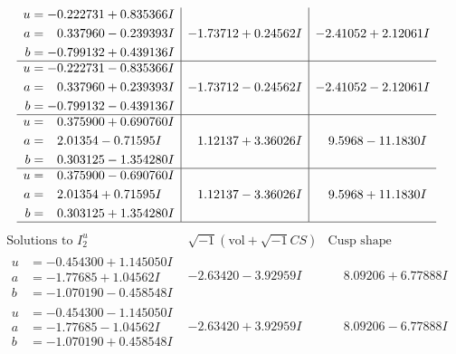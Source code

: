 \documentclass[1p]{elsarticle_modified}
\theoremstyle{definition}
\newcommand{\I}{\sqrt{-1}}
\begin{document}
$$\begin{array}{c|c|c}
\begin{aligned}
u &= -0.222731 + 0.835366 I \\
a &= \phantom{-}0.337960 - 0.239393 I \\
b &= -0.799132 + 0.439136 I\end{aligned}
 & -1.73712 + 0.24562 I & -2.41052 + 2.12061 I \\ \hline\begin{aligned}
u &= -0.222731 - 0.835366 I \\
a &= \phantom{-}0.337960 + 0.239393 I \\
b &= -0.799132 - 0.439136 I\end{aligned}
 & -1.73712 - 0.24562 I & -2.41052 - 2.12061 I \\ \hline\begin{aligned}
u &= \phantom{-}0.375900 + 0.690760 I \\
a &= \phantom{-}2.01354 - 0.71595 I \\
b &= \phantom{-}0.303125 - 1.354280 I\end{aligned}
 & \phantom{-}1.12137 + 3.36026 I & \phantom{-}9.5968 - 11.1830 I \\ \hline\begin{aligned}
u &= \phantom{-}0.375900 - 0.690760 I \\
a &= \phantom{-}2.01354 + 0.71595 I \\
b &= \phantom{-}0.303125 + 1.354280 I\end{aligned}
 & \phantom{-}1.12137 - 3.36026 I & \phantom{-}9.5968 + 11.1830 I\\
 \hline 
 \end{array}$$\newpage$$\begin{array}{c|c|c}  
\text{Solutions to }I^u_{2}& \I (\text{vol} + \sqrt{-1}CS) & \text{Cusp shape}\\
 \hline 
\begin{aligned}
u &= -0.454300 + 1.145050 I \\
a &= -1.77685 + 1.04562 I \\
b &= -1.070190 - 0.458548 I\end{aligned}
 & -2.63420 - 3.92959 I & \phantom{-}8.09206 + 6.77888 I \\ \hline\begin{aligned}
u &= -0.454300 - 1.145050 I \\
a &= -1.77685 - 1.04562 I \\
b &= -1.070190 + 0.458548 I\end{aligned}
 & -2.63420 + 3.92959 I & \phantom{-}8.09206 - 6.77888 I \\ \hline\begin{aligned}

\end{aligned}
\end{array}$$
\end{document}
